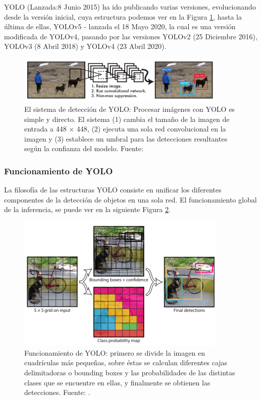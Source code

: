    YOLO \cite{yolo} (Lanzada:8 Junio 2015) ha ido publicando varias versiones, evolucionando desde la versión inicial, cuya estructura podemos ver en la Figura \ref{fig:yolo sistema}, hasta la última de ellas, YOLOv5 \cite{yolov5} - \cite{yolov5} lanzada el 18 Mayo 2020, la cual es una versión modificada de YOLOv4, pasando por las versiones YOLOv2 \cite{yolov2} (25 Diciembre 2016), YOLOv3 \cite{yolov3} (8 Abril 2018) y YOLOv4 \cite{yolov4} (23 Abril 2020).
   
   
\begin{figure}
    \centering
    \includegraphics[width=0.9\textwidth]{img/Yolo1sistema.png}
    \caption{El sistema de detección de YOLO: Procesar imágenes con YOLO es simple y directo. El sistema (1) cambia el tamaño de la imagen de entrada a 448 × 448, (2) ejecuta una sola red convolucional en la imagen y (3) establece un umbral para las detecciones resultantes según la confianza del modelo. Fuente: \cite{yolo}}
    \label{fig:yolo sistema}
\end{figure}
   
   
\subsubsection{Funcionamiento de YOLO}

La filosofía de las estructuras YOLO consiste en unificar los diferentes componentes de la detección de objetos en una sola red. El funcionamiento global de la inferencia, se puede ver en la siguiente Figura \ref{fig:yolo funcionamiento}.

\begin{figure}
    \centering
    \includegraphics[width=0.9\textwidth]{img/YoloModel.png}
    \caption{Funcionamiento de YOLO: primero se divide la imagen en cuadrículas más pequeñas, sobre éstas se calculan diferentes cajas delimitadoras o bounding boxes y las probabilidades de las distintas clases que se encuentre en ellas, y finalmente se obtienen las detecciones. Fuente: \cite{yolo}. }
    \label{fig:yolo funcionamiento}
\end{figure}

